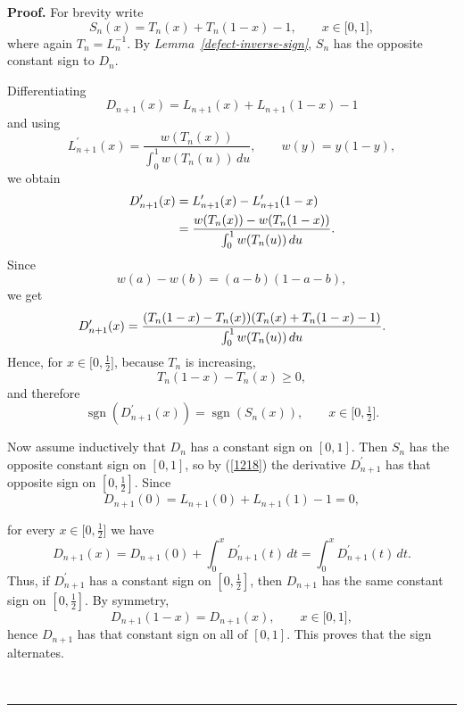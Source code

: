 \documentclass[onecolumn]{article}
\providecommand{\func}[1]{\operatorname{#1}}
\newenvironment{proof}[1][Proof]{\noindent\textbf{#1.} }{\ \rule{0.5em}{0.5em}}
\begin{document}
\begin{proof}
\noindent For brevity write 
\begin{equation}
S_{n}(x)=T_{n}(x)+T_{n}(1-x)-1,\qquad x\in \lbrack 0,1],  \label{1211}
\end{equation}%
where again $T_{n}=L_{n}^{-1}$. By \textit{Lemma~\ref{defect-inverse-sign}}, 
$S_{n}$ has the opposite constant sign to $D_{n}$.

Differentiating 
\begin{equation}
D_{n+1}(x)=L_{n+1}(x)+L_{n+1}(1-x)-1  \label{1212}
\end{equation}%
and using 
\begin{equation}
L_{n+1}^{\prime }(x)=\frac{w(T_{n}(x))}{\int_{0}^{1}w(T_{n}(u))\,du},\qquad
w(y)=y(1-y),  \label{1213}
\end{equation}%
we obtain 
\begin{align}
D_{n+1}^{\prime }(x)& =L_{n+1}^{\prime }(x)-L_{n+1}^{\prime }(1-x)
\label{1214} \\
& =\frac{w(T_{n}(x))-w(T_{n}(1-x))}{\int_{0}^{1}w(T_{n}(u))\,du}.  \notag
\end{align}%
Since 
\begin{equation}
w(a)-w(b)=(a-b)(1-a-b),  \label{1215}
\end{equation}%
we get 
\begin{equation}
D_{n+1}^{\prime }(x)=\frac{(T_{n}(1-x)-T_{n}(x))(T_{n}(x)+T_{n}(1-x)-1)}{%
\int_{0}^{1}w(T_{n}(u))\,du}.  \label{1216}
\end{equation}%
Hence, for $x\in \lbrack 0,\tfrac{1}{2}]$, because $T_{n}$ is increasing, 
\begin{equation}
T_{n}(1-x)-T_{n}(x)\geq 0,  \label{1217}
\end{equation}%
and therefore 
\begin{equation}
\func{sgn}(D_{n+1}^{\prime }(x))=\func{sgn}(S_{n}(x)),\qquad x\in \lbrack 0,%
\tfrac{1}{2}].  \label{1218}
\end{equation}

Now assume inductively that $D_{n}$ has a constant sign on $[0,1]$. Then $%
S_{n}$ has the opposite constant sign on $[0,1]$, so by (\ref{1218}) the
derivative $D_{n+1}^{\prime }$ has that opposite sign on $[0,\tfrac{1}{2}]$.
Since 
\begin{equation}
D_{n+1}(0)=L_{n+1}(0)+L_{n+1}(1)-1=0,  \label{1219}
\end{equation}

for every $x\in \lbrack 0,\tfrac{1}{2}]$ we have 
\begin{equation}
D_{n+1}(x)=D_{n+1}(0)+\int_{0}^{x}D_{n+1}^{\prime
}(t)\,dt=\int_{0}^{x}D_{n+1}^{\prime }(t)\,dt.  \label{1219.1}
\end{equation}%
Thus, if $D_{n+1}^{\prime }$ has a constant sign on $[0,\tfrac{1}{2}]$, then 
$D_{n+1}$ has the same constant sign on $[0,\tfrac{1}{2}]$. By symmetry, 
\begin{equation}
D_{n+1}(1-x)=D_{n+1}(x),\qquad x\in \lbrack 0,1],  \label{1220}
\end{equation}%
hence $D_{n+1}$ has that constant sign on all of $[0,1]$. This proves that
the sign alternates.


\end{proof}
\end{document}
